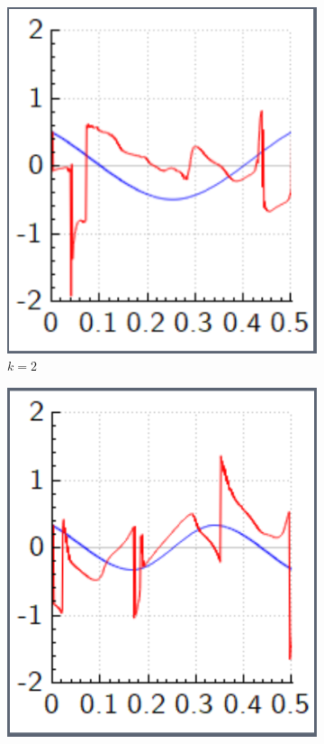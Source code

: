 \documentclass[a4paper, twocolumn]{revtex4-1}
\begin{document}
\begin{figure}
	\begin{subfigure}{0.4\columnwidth}
		\includegraphics[width=\columnwidth]{graphics/similar_solutions/k2.PNG}
		\caption{$k=2$}
	\end{subfigure}
	\begin{subfigure}{0.4\columnwidth}
		\includegraphics[width=\columnwidth]{graphics/similar_solutions/k3.PNG}

\end{subfigure}
\end{figure}
\end{document}
